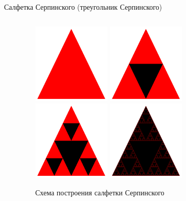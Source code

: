 \documentclass{beamer}
\begin{document}
\begin{frame}{Салфетка Серпинского (треугольник Серпинского)}
\begin{columns}
\begin{column}{0.3\textwidth}
			\end{column}
			\begin{column}{0.7\textwidth}
				\begin{figure}
					\includegraphics[width=0.35\textwidth]{images/1.png}
					\includegraphics[width=0.35\textwidth]{images/2.png}
					\includegraphics[width=0.35\textwidth]{images/3.png}
					\includegraphics[width=0.35\textwidth]{images/10.png}
					\caption{Схема построения салфетки Серпинского}
		\end{figure}
			\end{column}
		\end{columns}


\end{frame}
\end{document}
